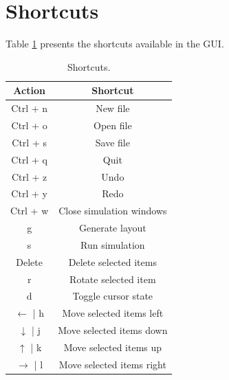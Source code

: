 \section{Shortcuts}
Table \ref{tb:shortcuts} presents the shortcuts available in the GUI.

\begin{table}
\begin{center}
\begin{singlespace}
\begin{tabular}{| c | c |}
\hline
Action & Shortcut \\
\hline
\hline
Ctrl + n & New file \\
Ctrl + o & Open file \\
Ctrl + s & Save file \\
Ctrl + q & Quit \\
Ctrl + z & Undo \\
Ctrl + y & Redo \\
Ctrl + w & Close simulation windows \\
g & Generate layout \\
s & Run simulation \\
Delete & Delete selected items \\
r & Rotate selected item \\
d & Toggle cursor state \\
$\leftarrow$ | h & Move selected items left \\
$\downarrow$ | j & Move selected items down \\
$\uparrow$ | k & Move selected items up \\
$\rightarrow$ | l & Move selected items right \\
\hline
\end{tabular}
\end{singlespace}
\end{center}
\label{tb:shortcuts}
\caption[GUI shortcuts]{Shortcuts.}
\end{table}
